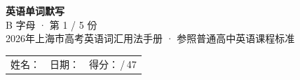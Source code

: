 \documentclass[10pt,a4paper]{article}
\begin{document}
\pagestyle{plain}

\begin{center}
{\LARGE\bfseries 英语单词默写}\\[0.22em]
{\large B 字母 · 第 1 / 5 份}\\[0.18em]
{\small 2026年上海市高考英语词汇用法手册 · 参照普通高中英语课程标准}
\end{center}

\vspace{0.25em}
\noindent\begin{tabular}{@{}p{}@{}p{}@{}p{}@{}}
姓名：\underline{\hspace{2.0cm}} & 日期：\underline{\hspace{2.0cm}} & 得分：\underline{\hspace{1.3cm}}\,/\,47 \\
\end{tabular}

\vspace{0.3em}

\vspace{0.08em}
\end{document}
